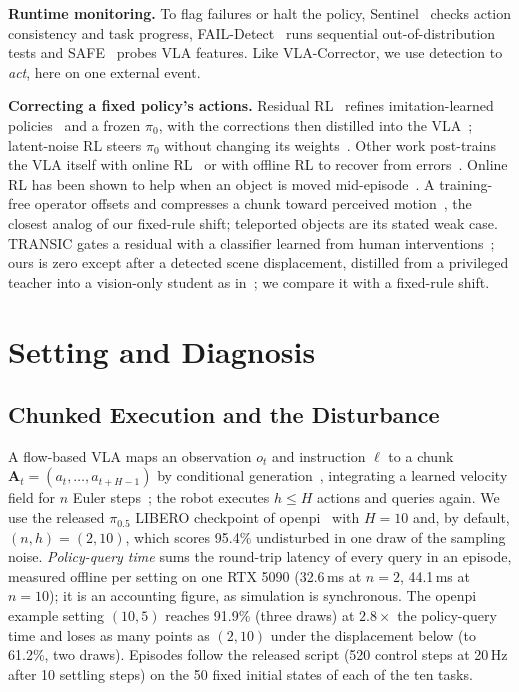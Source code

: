 \documentclass[conference,a4paper]{IEEEtran}
\begin{document}
\noindent\textbf{Runtime monitoring.}
To flag failures or halt the policy, Sentinel~\cite{agia2024sentinel} checks action consistency and task progress, FAIL-Detect~\cite{xu2025faildetect} runs sequential out-of-distribution tests and SAFE~\cite{gu2025safe} probes VLA features. Like VLA-Corrector, we use detection to \emph{act}, here on one external event.

\noindent\textbf{Correcting a fixed policy's actions.}
Residual RL~\cite{johannink2019residual} refines imitation-learned policies~\cite{yuan2025decorator,ankile2024resip} and a
frozen $\pi_0$, with the corrections then distilled into the VLA~\cite{xiao2025pld}; latent-noise RL steers $\pi_0$ without changing its weights~\cite{wagenmaker2025dsrl}. Other work post-trains the VLA itself with online
RL~\cite{chen2025conrft,guo2025irevla} or with offline RL to recover from errors~\cite{gao2026ogpo}. Online RL has been shown to help when an
object is moved mid-episode~\cite{liu2025rl4vla}. A training-free operator offsets and
compresses a chunk toward perceived motion~\cite{zhang2026pacepath}, the
closest analog of our fixed-rule shift; teleported objects are its stated weak case. \mbox{TRANSIC} gates a residual with a classifier learned from human interventions~\cite{jiang2024transic}; ours is zero except after a detected scene displacement,
distilled from a privileged teacher into a vision-only student as
in~\cite{ankile2024resip}; we compare it with a fixed-rule shift.

\section{Setting and Diagnosis}\label{sec:diag}

\subsection{Chunked Execution and the Disturbance}
A flow-based VLA maps an observation $o_t$ and instruction $\ell$ to a
chunk $\mathbf{A}_t=(a_t,\dots,a_{t+H-1})$ by conditional generation~\cite{lipman2022flow,oh2026ptdiff}, integrating a learned velocity
field for $n$ Euler steps~\cite{black2024pi0}; the robot
executes $h\le H$ actions and queries again. We use the released $\pi_{0.5}$ LIBERO checkpoint of openpi~\cite{pi05} with
$H=10$ and, by default, $(n,h)=(2,10)$, which scores 95.4\% undisturbed in one draw of the sampling noise. \emph{Policy-query time} sums the round-trip latency of every query in an episode, measured offline per setting on one RTX 5090 (32.6\,ms at $n=2$, 44.1\,ms at $n=10$); it is an accounting figure, as simulation is synchronous. The openpi example setting $(10,5)$ reaches 91.9\% (three draws) at $2.8\times$ the policy-query time and loses as many points as $(2,10)$ under the displacement below (to 61.2\%, two draws).
Episodes follow the released script (520
control steps at 20\,Hz after 10 settling steps) on the 50 fixed initial
states of each of the ten tasks.
\end{document}
